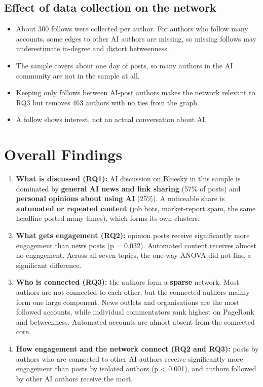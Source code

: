 \documentclass[
  10pt,
]{article}
\providecommand{\tightlist}{%
  \setlength{\itemsep}{0pt}\setlength{\parskip}{0pt}}
\begin{document}
\subsection{Effect of data collection on the
network}\label{effect-of-data-collection-on-the-network}

\begin{itemize}
\tightlist
\item
  About 300 follows were collected per author. For authors who follow
  many accounts, some edges to other AI authors are missing, so missing
  follows may underestimate in-degree and distort betweenness.
\item
  The sample covers about one day of posts, so many authors in the AI
  community are not in the sample at all.
\item
  Keeping only follows between AI-post authors makes the network
  relevant to RQ3 but removes 463 authors with no ties from the graph.
\item
  A follow shows interest, not an actual conversation about AI.
\end{itemize}

\section{Overall Findings}\label{overall-findings}

\begin{enumerate}
\def\labelenumi{\arabic{enumi}.}
\tightlist
\item
  \textbf{What is discussed (RQ1):} AI discussion on Bluesky in this
  sample is dominated by \textbf{general AI news and link sharing} (57\%
  of posts) and \textbf{personal opinions about using AI} (25\%). A
  noticeable share is \textbf{automated or repeated content} (job bots,
  market-report spam, the same headline posted many times), which forms
  its own clusters.
\item
  \textbf{What gets engagement (RQ2):} opinion posts receive
  significantly more engagement than news posts (p = 0.032). Automated
  content receives almost no engagement. Across all seven topics, the
  one-way ANOVA did not find a significant difference.
\item
  \textbf{Who is connected (RQ3):} the authors form a \textbf{sparse}
  network. Most authors are not connected to each other, but the
  connected authors mainly form one large component. News outlets and
  organisations are the most followed accounts, while individual
  commentators rank highest on PageRank and betweenness. Automated
  accounts are almost absent from the connected core.
\item
  \textbf{How engagement and the network connect (RQ2 and RQ3):} posts
  by authors who are connected to other AI authors receive significantly
  more engagement than posts by isolated authors (p \textless{} 0.001),
  and authors followed by other AI authors receive the most.
\end{enumerate}
\end{document}
